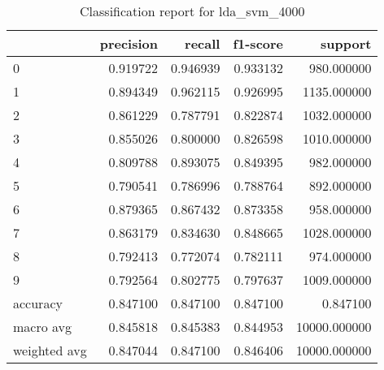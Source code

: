 \begin{table}[htb!]
\centering
\caption{Classification report for lda_svm_4000}
\label{tab:classification-report-lda_svm_4000}
\begin{tabular}{lrrrr}
\toprule
 & precision & recall & f1-score & support \\
\midrule
0 & 0.919722 & 0.946939 & 0.933132 & 980.000000 \\
1 & 0.894349 & 0.962115 & 0.926995 & 1135.000000 \\
2 & 0.861229 & 0.787791 & 0.822874 & 1032.000000 \\
3 & 0.855026 & 0.800000 & 0.826598 & 1010.000000 \\
4 & 0.809788 & 0.893075 & 0.849395 & 982.000000 \\
5 & 0.790541 & 0.786996 & 0.788764 & 892.000000 \\
6 & 0.879365 & 0.867432 & 0.873358 & 958.000000 \\
7 & 0.863179 & 0.834630 & 0.848665 & 1028.000000 \\
8 & 0.792413 & 0.772074 & 0.782111 & 974.000000 \\
9 & 0.792564 & 0.802775 & 0.797637 & 1009.000000 \\
accuracy & 0.847100 & 0.847100 & 0.847100 & 0.847100 \\
macro avg & 0.845818 & 0.845383 & 0.844953 & 10000.000000 \\
weighted avg & 0.847044 & 0.847100 & 0.846406 & 10000.000000 \\
\bottomrule
\end{tabular}
\end{table}
